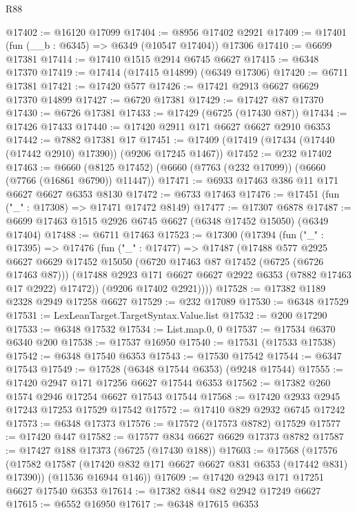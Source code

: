\begin{lexlean}{R88}
\begin{coremodule}
@17402 := @16120 @17099
@17404 := @8956 @17402 @2921
@17409 := @17401 (fun (__b : @6345) => @6349 (@10547 @17404)) @17306
@17410 := @6699 @17381
@17414 := @17410 @1515 @2914 @6745 @6627
@17415 := @6348 @17370
@17419 := @17414 (@17415 @14899) (@6349 @17306)
@17420 := @6711 @17381
@17421 := @17420 @577
@17426 := @17421 @2913 @6627 @6629 @17370 @14899
@17427 := @6720 @17381
@17429 := @17427 @87 @17370
@17430 := @6726 @17381
@17433 := @17429 (@6725 (@17430 @87))
@17434 := @17426 @17433
@17440 := @17420 @2911 @171 @6627 @6627 @2910 @6353
@17442 := @7882 @17381 @17
@17451 := @17409 (@17419 (@17434 (@17440 (@17442 @2910) @17390)) (@9206 @17245 @1467))
@17452 := @232 @17402
@17463 := @6660 (@8125 @17452) (@6660 (@7763 (@232 @17099)) (@6660 (@7766 (@16861 @6790)) @11447))
@17471 := @6933 @17463 @386 @11 @171 @6627 @6627 @6353 @8130
@17472 := @6733 @17463
@17476 := @17451 (fun ("_" : @17308) => @17471 @17472 @8149)
@17477 := @17307 @6878
@17487 := @6699 @17463 @1515 @2926 @6745 @6627 (@6348 @17452 @15050) (@6349 @17404)
@17488 := @6711 @17463
@17523 := @17300
    (@17394
      (fun ("_" : @17395) =>
      @17476
        (fun ("_" : @17477) =>
        @17487
          (@17488
            @577
            @2925
            @6627
            @6629
            @17452
            @15050
            (@6720 @17463 @87 @17452 (@6725 (@6726 @17463 @87)))
            (@17488 @2923 @171 @6627 @6627 @2922 @6353 (@7882 @17463 @17 @2922) @17472))
          (@9206 @17402 @2921))))
@17528 := @17382 @1189 @2328 @2949 @17258 @6627
@17529 := @232 @17089
@17530 := @6348 @17529
@17531 := LexLeanTarget.TargetSyntax.Value.list
@17532 := @200 @17290
@17533 := @6348 @17532
@17534 := List.map.{0, 0}
@17537 := @17534 @6370 @6340 @200
@17538 := @17537 @16950
@17540 := @17531 (@17533 @17538)
@17542 := @6348 @17540 @6353
@17543 := @17530 @17542
@17544 := @6347 @17543
@17549 := @17528 (@6348 @17544 @6353) (@9248 @17544)
@17555 := @17420 @2947 @171 @17256 @6627 @17544 @6353
@17562 := @17382 @260 @1574 @2946 @17254 @6627 @17543 @17544
@17568 := @17420 @2933 @2945 @17243 @17253 @17529 @17542
@17572 := @17410 @829 @2932 @6745 @17242
@17573 := @6348 @17373
@17576 := @17572 (@17573 @8782) @17529
@17577 := @17420 @447
@17582 := @17577 @834 @6627 @6629 @17373 @8782
@17587 := @17427 @188 @17373 (@6725 (@17430 @188))
@17603 := @17568
    (@17576
      (@17582 @17587 (@17420 @832 @171 @6627 @6627 @831 @6353 (@17442 @831) @17390))
      (@11536 @16944 @146))
@17609 := @17420 @2943 @171 @17251 @6627 @17540 @6353
@17614 := @17382 @844 @82 @2942 @17249 @6627
@17615 := @6552 @16950
@17617 := @6348 @17615 @6353

\end{coremodule}
\end{lexlean}
